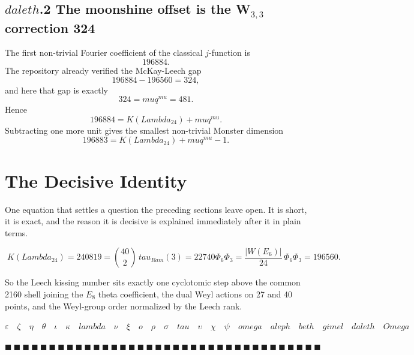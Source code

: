 \documentclass[12pt,a4paper]{article}
\def\mathrm#1{#1}%
\def\omega{omega}%
\def\lambda{lambda}%
\def\Lambda{Lambda}%
\def\mu{mu}%
\def\Phi#1{Phi#1}%
\def\tau{tau}%
\def\aleph{aleph}%
\def\beth{beth}%
\def\gimel{gimel}%
\def\daleth{daleth}%
\def\Omega{Omega}%
\def\cdot{ }%
\theoremstyle{definition}
\begin{document}
\subsection*{$\daleth$.2 \quad The moonshine offset is the W$_{3,3}$ correction 324}

The first non-trivial Fourier coefficient of the classical $j$-function is
\[
196884.
\]
The repository already verified the McKay-Leech gap
\[
196884 - 196560 = 324,
\]
and here that gap is exactly
\[
324 = \mu q^{\mu} = 4\cdot 81.
\]
Hence
\[
\boxed{\;196884 = K(\Lambda_{24}) + \mu q^{\mu}.\;}
\]
Subtracting one more unit gives the smallest non-trivial Monster dimension
\[
196883 = K(\Lambda_{24}) + \mu q^{\mu} - 1.
\]

\section*{The Decisive Identity}

\begin{plainbox}
One equation that settles a question the preceding sections leave open. It is short,
it is exact, and the reason it is decisive is explained immediately after it in plain
terms.
\end{plainbox}


\[
\boxed{\;
K(\Lambda_{24})
= 240\cdot 819
= \binom{40}{2}\,\tau_{\mathrm{Ram}}(3)
= 2\cdot 27\cdot 40\cdot \Phi_6\Phi_3
= \frac{|W(E_6)|}{24}\,\Phi_6\Phi_3
= 196560.
\;}
\]

So the Leech kissing number sits exactly one cyclotomic step above the common
2160 shell joining the $E_8$ theta coefficient, the dual Weyl actions on 27 and
40 points, and the Weyl-group order normalized by the Leech rank.

\hfill$\varepsilon\quad\zeta\quad\eta\quad\theta\quad\iota\quad\kappa\quad\lambda\quad\nu\quad\xi\quad o\quad\rho\quad\sigma\quad\tau\quad\upsilon\quad\chi\quad\psi\quad\omega\quad\aleph\quad\beth\quad\gimel\quad\daleth\quad\Omega$

\hfill $\blacksquare\ \blacksquare\ \blacksquare\ \blacksquare\ \blacksquare\ \blacksquare\ \blacksquare\ \blacksquare\ \blacksquare\ \blacksquare\ \blacksquare\ \blacksquare\ \blacksquare\ \blacksquare\ \blacksquare\ \blacksquare\ \blacksquare\ \blacksquare\ \blacksquare\ \blacksquare\ \blacksquare\ \blacksquare\ \blacksquare\ \blacksquare\ \blacksquare\ \blacksquare\ \blacksquare\ \blacksquare\ \blacksquare\ \blacksquare\ \blacksquare\ \blacksquare\ \blacksquare\ \blacksquare\ \blacksquare\ \blacksquare$
\end{document}
